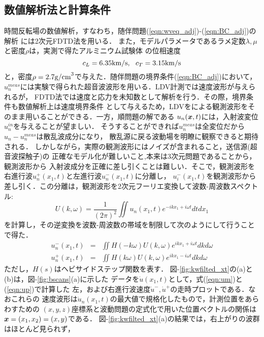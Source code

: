 \subsection{数値解析法と計算条件}
時間反転場の数値解析，すなわち，随伴問題(\ref{eqn:wveq_adj})-(\ref{eqn:BC_adj})の解析
には2次元FDTD法を用いる．
また，モデルパラメータであるラメ定数$\lambda, \mu$と密度$\rho$は，実測で得たアルミニウム試験体
の位相速度
\begin{equation}
	c_L=6.35{\rm km/s}, \ \ c_T=3.15{\rm km/s}
	\label{eqn:}
\end{equation}
と，密度$\rho=2.7{\rm g/cm}^3$で与えた．随伴問題の境界条件(\ref{eqn:BC_adj})において，
$u_n^{meas}$には実験で得られた超音波波形を用いる．LDV計測では速度波形が与えられるが，
FDTD法では速度と応力を未知数として解析を行う．その際，境界条件も数値解析上は速度境界条件
として与えるため，LDVをによる観測波形をそのまま用いることができる．一方，順問題の解である
$u_n(\boldsymbol{x},t)$には，入射波変位$u_n^{in}$を与えることが望ましい．
そうすることができれば$u_n^{meas}$は全変位だから$u_n-u_n^{meas}$は散乱波成分になり，
散乱源に戻る波動場を明瞭に観察できると期待される．
しかしながら，実際の観測波形にはノイズが含まれること，送信源(超音波探触子)の
正確なモデル化が難しいこと,本来は3次元問題であることから，観測波形から
入射波成分を正確に差し引くことは難しい．そこで，観測波形を右進行波$u_n^{+}(x_1,t)$と左進行波$u_n^{-}(x_1,t)$に分離し，
$u_i^{-}(x_1,t)$を観測波形から差し引く．この分離は，観測波形を2次元フーリエ変換して波数-周波数スペクトル:
\begin{equation}
	U(k,\omega)= \frac{1}{(2\pi)^2} \iint u_n(x_1,t)e^{-ikx_1+i\omega t}dtdx_1
	\label{eqn:}
\end{equation}
を計算し，その逆変換を波数-周波数の帯域を制限して次のようにして行うことで得た．
\begin{eqnarray}
	u_n^-(x_1,t) &=& \iint H(-k\omega)U(k,\omega)e^{ikx_1+i\omega t}dk d\omega
	\label{eqn:um} \\
	u_n^+(x_1,t) &=& \iint H(k\omega) U(k,\omega)e^{ikx_1-i\omega t}dk d\omega 
	\label{eqn:up}
\end{eqnarray}
ただし，$H(s)$はヘビサイドステップ関数を表す．
{\rm 図}-\ref{fig:kwfilted_xt}の(a)と(b)は，{\rm 図}-\ref{fig:bscans}(a)に示した
データを$\dot u(x_1,t)$として，式(\ref{eqn:um})と(\ref{eqn:up})で計算した
左，および右進行波速度$\dot{u}^-,\dot{u}^+$の走時プロットである．なおこれらの
速度波形は$\dot u_n(x_1,t)$の最大値で規格化したもので，計測位置をあらわすための
$(x,y,z)$座標系と波動問題の定式化で用いた位置ベクトルの関係は
$\boldsymbol{x}=(x_1,x_2)=(x,y)$である．
{\rm 図-}\ref{fig:kwfilted_xt}(a)の結果では，右上がりの波群はほとんど見られず，

